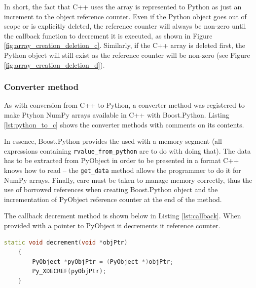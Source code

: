 In short, the fact that C++ uses the array is represented to Python as just an 
increment to the object reference counter. Even if the Python object goes out 
of scope or is explicitly deleted, the reference counter will always be non-zero 
until the callback function to decrement it is executed, as shown in Figure 
\ref{fig:array_creation_deletion_c}. Similarly, if the C++ array is deleted first, 
the Python object will still exist as the reference counter will be non-zero 
(see Figure \ref{fig:array_creation_deletion_d}).

\subsubsection{Converter method}

As with conversion from C++ to Python, a converter method was registered 
to make Ptyhon NumPy arrays available in C++ with Boost.Python. 
Listing \ref{lst:python_to_c} shows the converter methods with comments on its contents.

In essence, Boost.Python provides the used with a memory segment (all expressions 
containing \linebreak \texttt{rvalue\_from\_python} are to do with doing that). The 
data has to be extracted from PyObject in order to be presented in a format C++ knows 
how to read -- the \texttt{get\_data} method allows the programmer to do it for 
NumPy arrays. Finally, care must be taken to manage memory correctly, thus the 
use of borrowed references when creating Boost.Python object and the incrementation 
of PyObject reference counter at the end of the method.

The callback decrement method is shown below in Listing \ref{lst:callback}. 
When provided with a pointer to PyObject it decrements it reference counter.

\begin{lstlisting}[caption={The decrement method called when the \texttt{m\_count} of C++ array reaches 0.}, label={lst:callback}, language=C++]
static void decrement(void *objPtr) 
    {
        PyObject *pyObjPtr = (PyObject *)objPtr;
        Py_XDECREF(pyObjPtr);
    }
\end{lstlisting}

